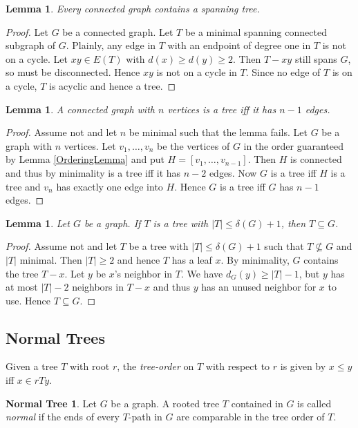 \documentclass[12pt]{article}
\theoremstyle{plain}
\newtheorem{lem}[thm]{Lemma}
\theoremstyle{definition}
\newtheorem*{NormalTree}{Normal Tree}
\theoremstyle{remark}
\newcommand{\card}[1]{\left|#1\right|}
\begin{document}
\begin{lem}\label{SpanningTree}
Every connected graph contains a spanning tree.
\end{lem}
\begin{proof}
Let $G$ be a connected graph.  Let $T$ be a minimal spanning connected subgraph of $G$.  Plainly, any edge in $T$ with an endpoint of degree one in $T$ is not on a cycle.  Let $xy \in E(T)$ with $d(x) \geq d(y) \geq 2$.  Then $T - xy$ still spans $G$, so must be disconnected.  Hence $xy$ is not on a cycle in $T$.  Since no edge of $T$ is on a cycle, $T$ is acyclic and hence a tree.
\end{proof}

\begin{lem}
A connected graph with $n$ vertices is a tree iff it has $n-1$ edges.
\end{lem}
\begin{proof}
Assume not and let $n$ be minimal such that the lemma fails.  Let $G$ be a graph with $n$ vertices.  Let $v_1, \ldots, v_n$ be the vertices of $G$ in the order guaranteed by Lemma \ref{OrderingLemma} and put $H = [v_1, \ldots, v_{n-1}]$.  Then $H$ is connected and thus by minimality is a tree iff it has $n-2$ edges.  Now $G$ is a tree iff $H$ is a tree and $v_n$ has exactly one edge into $H$.  Hence $G$ is a tree iff $G$ has $n-1$ edges.
\end{proof}

\begin{lem}
Let $G$ be a graph.  If $T$ is a tree with $\card{T} \leq \delta(G) + 1$, then $T \subseteq G$.
\end{lem}
\begin{proof}
Assume not and let $T$ be a tree with $\card{T} \leq \delta(G) + 1$ such that $T \not \subseteq G$ and $\card{T}$ minimal.  Then $\card{T} \geq 2$ and hence $T$ has a leaf $x$.  By minimality, $G$ contains the tree $T - x$.  Let $y$ be $x$'s neighbor in $T$.  We have $d_G(y) \geq \card{T} - 1$, but $y$ has at most $\card{T} - 2$ neighbors in $T - x$ and thus $y$ has an unused neighbor for $x$ to use.  Hence $T \subseteq G$.
\end{proof}

\subsection{Normal Trees}
Given a tree $T$ with root $r$, the \emph{tree-order} on $T$ with respect to $r$ is given by $x \leq y$ iff $x \in rTy$.

\begin{NormalTree}
Let $G$ be a graph.  A rooted tree $T$ contained in $G$ is called \emph{normal} if the ends of every $T$-path in $G$ are comparable in the tree order of $T$.
\end{NormalTree}
\end{document}
